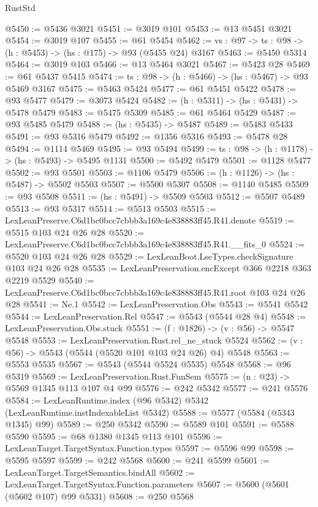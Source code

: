 \begin{lexlean}{RustStd}
\begin{coremodule}
@5450 := @5436 @3021
@5451 := @3019 @101
@5453 := @13 @5451 @3021
@5454 := @3019 @107
@5455 := @61 @5454
@5462 := {vs : @97} -> {ts : @98} -> (h : @5453) -> (hs : @175) -> @93 (@5455 @24) @3167
@5463 := @5450 @5314
@5464 := @3019 @103
@5466 := @13 @5464 @3021
@5467 := @5423 @28
@5469 := @61 @5437 @5415
@5474 := {ts : @98} -> (h : @5466) -> (hs : @5467) -> @93 @5469 @3167
@5475 := @5463 @5424
@5477 := @61 @5451 @5422
@5478 := @93 @5477
@5479 := @3073 @5424
@5482 := (h : @5311) -> (hs : @5431) -> @5478 @5479
@5483 := @5475 @5309
@5485 := @61 @5464 @5429
@5487 := @93 @5485 @5479
@5488 := (hs : @5435) -> @5487
@5489 := @5483 @5433
@5491 := @93 @5316 @5479
@5492 := @1356 @5316
@5493 := @5478 @28
@5494 := @1114 @5469
@5495 := @93 @5494
@5499 := {ts : @98} -> (h : @1178) -> (hs : @5493) -> @5495 @1131
@5500 := @5492 @5479
@5501 := @1128 @5477
@5502 := @93 @5501
@5503 := @1106 @5479
@5506 := (h : @1126) -> (hs : @5487) -> @5502 @5503
@5507 := @5500 @5307
@5508 := @1140 @5485
@5509 := @93 @5508
@5511 := (hs : @5491) -> @5509 @5503
@5512 := @5507 @5489
@5513 := @93 @5317
@5514 := @5513 @5503
@5515 := LexLeanPreserve.C6d1bc0bcc7cbbb3a169c4e838883ff45.R41.denote
@5519 := @5515 @103 @24 @26 @28
@5520 := LexLeanPreserve.C6d1bc0bcc7cbbb3a169c4e838883ff45.R41.__fits_0
@5524 := @5520 @103 @24 @26 @28
@5529 := LexLeanBoot.LseTypes.checkSignature @103 @24 @26 @28
@5535 := LexLeanPreservation.encExcept @366 @2218 @363 @2219 @5529
@5540 := LexLeanPreserve.C6d1bc0bcc7cbbb3a169c4e838883ff45.R41.root @103 @24 @26 @28
@5541 := Ne.{1}
@5542 := LexLeanPreservation.Obs
@5543 := @5541 @5542
@5544 := LexLeanPreservation.Rel
@5547 := @5543 (@5544 @28 @4)
@5548 := LexLeanPreservation.Obs.stuck
@5551 := (f : @1826) -> (v : @56) -> @5547 @5548
@5553 := LexLeanPreservation.Rust.rel_ne_stuck @5524
@5562 := (v : @56) -> @5543 (@5544 (@5520 @101 @103 @24 @26) @4) @5548
@5563 := @5553 @5535
@5567 := @5543 (@5544 @5524 @5535) @5548
@5568 := @96 @5319
@5569 := LexLeanPreservation.Rust.FunSem
@5575 := (n : @23) -> @5569 @1345 @113 @107 @4 @99
@5576 := @242 @5342
@5577 := @241 @5576
@5584 := LexLeanRuntime.index (@96 @5342) @5342 (LexLeanRuntime.instIndexableList @5342)
@5588 := @5577 (@5584 (@5343 @1345) @99)
@5589 := @250 @5342
@5590 := @5589 @101
@5591 := @5588 @5590
@5595 := @68 @1380 @1345 @113 @101
@5596 := LexLeanTarget.TargetSyntax.Function.types
@5597 := @5596 @99
@5598 := @5595 @5597
@5599 := @242 @5568
@5600 := @241 @5599
@5601 := LexLeanTarget.TargetSemantics.bindAll
@5602 := LexLeanTarget.TargetSyntax.Function.parameters
@5607 := @5600 (@5601 (@5602 @107) @99 @5331)
@5608 := @250 @5568

\end{coremodule}
\end{lexlean}
